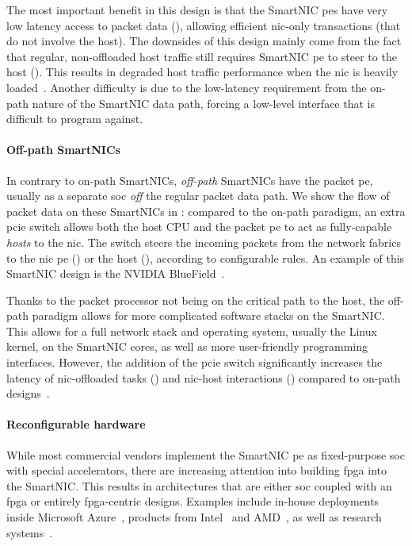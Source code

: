 The most important benefit in this design is that the SmartNIC \acs{pe}s have very low latency access to packet data (), allowing efficient \ac{nic}-only transactions (that do not involve the host).  The downsides of this design mainly come from the fact that regular, non-offloaded host traffic still requires SmartNIC \ac{pe} to steer to the host ().  This results in degraded host traffic performance when the \ac{nic} is heavily loaded~\cite{liu_offloading_2019}.  Another difficulty is due to the low-latency requirement from the on-path nature of the SmartNIC data path, forcing a low-level interface that is difficult to program against.

\paragraph{Off-path SmartNICs} In contrary to on-path SmartNICs, \emph{off-path} SmartNICs have the packet \ac{pe}, usually as a separate \ac{soc} \emph{off} the regular packet data path.  We show the flow of packet data on these SmartNICs in : compared to the on-path paradigm, an extra \ac{pcie} switch allows both the host CPU and the packet \ac{pe} to act as fully-capable \emph{hosts} to the \ac{nic}.  The switch steers the incoming packets from the network fabrics to the \ac{nic} \ac{pe} () or the host (), according to configurable rules.  An example of this SmartNIC design is the NVIDIA BlueField~\cite{nvidia_corporation_nvidia_2021}.

Thanks to the packet processor not being on the critical path to the host, the off-path paradigm allows for more complicated software stacks on the SmartNIC.  This allows for a full network stack and operating system, usually the Linux kernel, on the SmartNIC cores, as well as more user-friendly programming interfaces.  However, the addition of the \ac{pcie} switch significantly increases the latency of \ac{nic}-offloaded tasks () and \ac{nic}-host interactions () compared to on-path designs~\cite{wei_characterizing_2023}.

\paragraph{Reconfigurable hardware} While most commercial vendors implement the SmartNIC \ac{pe} as fixed-purpose \ac{soc} with special accelerators, there are increasing attention into building \ac{fpga} into the SmartNIC.  This results in architectures that are either \ac{soc} coupled with an \ac{fpga} or entirely \ac{fpga}-centric designs.  Examples include in-house deployments inside Microsoft Azure~\cite{firestone_azure_2018}, products from Intel~\cite{intel_intel_nodate} and AMD~\cite{xilinx_alveo_2020, xilinx_alveo_2022}, as well as research systems~\cite{wang_fpganic_2022, khazraee_rosebud_2023}.

